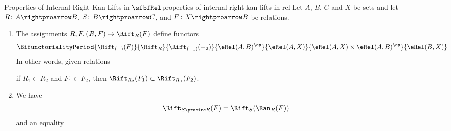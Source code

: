 \begin{proposition}{Properties of Internal Right Kan Lifts in $\sfbfRel$}{properties-of-internal-right-kan-lifts-in-rel}%
    Let $A$, $B$, $C$ and $X$ be sets and let $R\colon A\rightproarrow B$, $S\colon B\rightproarrow C$, and $F\colon X\rightproarrow B$ be relations.
    \begin{enumerate}
        \item\label{properties-of-internal-right-kan-lifts-in-rel-functoriality}The assignments $R,F,(R,F)\mapsto\Rift_{R}(F)$ define functors
            \[
                \BifunctorialityPeriod{\Rift_{(-)}(F)}{\Rift_{R}}{\Rift_{(-_{1})}(-_{2})}{\eRel(A,B)^{\op}}{\eRel(A,X)}{\eRel(A,X)\times\eRel(A,B)^{\op}}{\eRel(B,X)}%
            \]%
            In other words, given relations
            \begin{webcompile}
                \qquad
            \end{webcompile}
            if $R_{1}\subset R_{2}$ and $F_{1}\subset F_{2}$, then $\Rift_{R_{2}}(F_{1})\subset\Rift_{R_{1}}(F_{2})$.
        \item\label{properties-of-internal-right-kan-lifts-in-rel-interaction-with-composition}We have
            \[
                \Rift_{S\procirc R}(F)%
                =
                \Rift_{S}(\Ran_{R}(F))%
            \]%
            and an equality
            \begin{webcompile}
                \begin{tikzcd}[row sep={4.0*\the\DL,between origins}, column sep={4.0*\the\DL,between origins}, background color=backgroundColor, ampersand replacement=\&]

\end{tikzcd}
\end{webcompile}
\end{enumerate}
\end{proposition}
